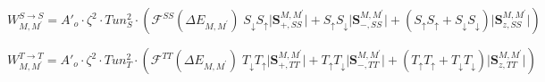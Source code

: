 \documentclass[reprint,amsmath,amssymb,aps,nofootinbib,onecolumn]{revtex4-2}
\begin{document}
\begin{equation}
W_{M,M^{\prime}}^{S \rightarrow S}=A'_{o}\cdot\zeta^2\cdot Tun_S^2\cdot \left( \mathcal{F}^{SS}(\Delta E_{M,M^{\prime}})\;S_{\downarrow}S_{\uparrow} \lvert \textbf{S}_{+,SS}^{M,M^{\prime}}\rvert +  S_{\uparrow}S_{\downarrow} \lvert {\textbf{S}_{-,SS}^{M,M^{\prime}}}\rvert +\left( S_{\uparrow}S_{\uparrow}+S_{\downarrow}S_{\downarrow}  \right) \lvert \textbf{S}_{z,SS}^{M,M^{\prime}}\rvert \right)
\end{equation}

\begin{equation}
W_{M,M^{\prime}}^{T \rightarrow T}=A'_{o}\cdot \zeta^2\cdot Tun_T^2\cdot\left( \mathcal{F}^{TT}(\Delta E_{M,M^{\prime}})\;T_{\downarrow}T_{\uparrow} \lvert \textbf{S}_{+,TT}^{M,M^{\prime}}\rvert +  T_{\uparrow}T_{\downarrow} \lvert {\textbf{S}_{-,TT}^{M,M^{\prime}}}\rvert +\left( T_{\uparrow}T_{\uparrow}+T_{\downarrow}T_{\downarrow}  \right) \lvert \textbf{S}_{z,TT}^{M,M^{\prime}}\rvert \right)
\end{equation}



\end{document}
